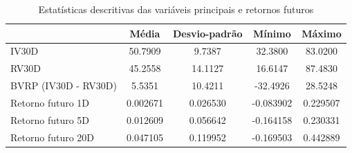 \begin{table}[H]
\centering
\caption{Estatísticas descritivas das variáveis principais e retornos futuros}
\label{tab:estatisticas_cap3}
\begin{tabular}{lcccc}
\toprule
 & Média & Desvio-padrão & Mínimo & Máximo \\
\midrule
IV30D & 50.7909 & 9.7387 & 32.3800 & 83.0200 \\
RV30D & 45.2558 & 14.1127 & 16.6147 & 87.4830 \\
BVRP (IV30D - RV30D) & 5.5351 & 10.4211 & -32.4926 & 28.5248 \\
Retorno futuro 1D & 0.002671 & 0.026530 & -0.083902 & 0.229507 \\
Retorno futuro 5D & 0.012609 & 0.056642 & -0.164158 & 0.230331 \\
Retorno futuro 20D & 0.047105 & 0.119952 & -0.169503 & 0.442889 \\
\bottomrule
\end{tabular}
\end{table}

